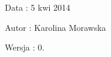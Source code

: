 \begin{DoxyDate}{Data}
\-: 5 kwi 2014 
\end{DoxyDate}
\begin{DoxyAuthor}{Autor}
\-: Karolina Morawska 
\end{DoxyAuthor}
\begin{DoxyVersion}{Wersja}
\-: 0. 
\end{DoxyVersion}
